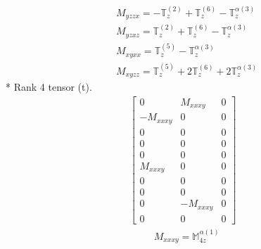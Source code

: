 \documentclass[fleqn,8pt,landscape]{jsarticle}
\begin{document}
\begin{align*}
& M_{yzzx} = - \mathbb{T}_{z}^{(2)} + \mathbb{T}_{z}^{(6)} - \mathbb{T}_{z}^{\alpha(3)} \\
& M_{yzxz} = \mathbb{T}_{z}^{(2)} + \mathbb{T}_{z}^{(6)} - \mathbb{T}_{z}^{\alpha(3)} \\
& M_{xyxx} = \mathbb{T}_{z}^{(5)} - \mathbb{T}_{z}^{\alpha(3)} \\
& M_{xyzz} = \mathbb{T}_{z}^{(5)} + 2 \mathbb{T}_{z}^{(6)} + 2 \mathbb{T}_{z}^{\alpha(3)}
\end{align*}
* Rank 4 tensor (t).
\begin{align*}
\begin{bmatrix} 0 & M_{xxxy} & 0 \\ - M_{xxxy} & 0 & 0 \\ 0 & 0 & 0 \\ 0 & 0 & 0 \\ 0 & 0 & 0 \\ M_{xxxy} & 0 & 0 \\ 0 & 0 & 0 \\ 0 & 0 & 0 \\ 0 & - M_{xxxy} & 0 \\ 0 & 0 & 0 \end{bmatrix}
\end{align*}
\begin{align*}
& M_{xxxy} = \mathbb{M}_{4z}^{\alpha(1)}
\end{align*}
\end{document}

